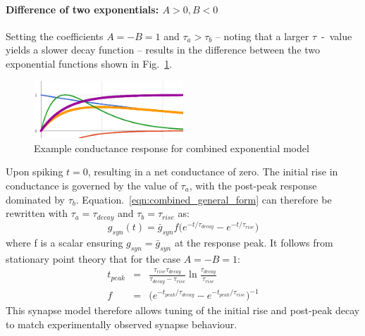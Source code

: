 \documentclass[12pt]{article}
\begin{document}
\paragraph{Difference of two exponentials: $A>0, B<0$ \newline}
\noindent Setting the coefficients $A = -B = 1$ and $\tau_a > \tau_b$ --
noting that a larger $\tau$~-~value yields a slower decay function -- results in
the difference between the two exponential functions shown in Fig.~\ref{fig:difference_exp_example}.
\begin{figure}[!h]
\begin{centering}
\includegraphics[width=0.5\textwidth]{figures/combined_general_difference.ps}
\caption{Example conductance response for combined exponential model}
\label{fig:difference_exp_example}
\end{centering}
\end{figure}
Upon spiking $t = 0$, resulting in a net conductance of zero. The initial rise
in conductance is governed by the value of $\tau_a$, with the post-peak response
dominated by $\tau_b$. Equation.~\ref{eqn:combined_general_form} can
therefore be rewritten with $\tau_a = \tau_{decay}$ and $\tau_b = \tau_{rise}$
as:
\begin{equation}
g_{syn}(t)=\bar{g}_{syn}f\Big(e^{-t / \tau_{decay}} - e^{-t /
\tau_{rise}}\Big)
\label{eqn:}
\end{equation}
where f is a scalar ensuring $g_{syn} = \bar{g}_{syn}$ at the response peak. It
follows from stationary point theory that for the case $A = -B = 1$:
\begin{eqnarray}
t_{peak}&=&\frac{\tau_{rise}\tau_{decay}}{\tau_{decay}
- \tau_{rise}}\ln\frac{\tau_{decay}}{\tau_{rise}} \nonumber
\\
f&=&\Big( e^{-t_{peak} / \tau_{decay}} - e^{-t_{peak} / \tau_{rise}}\Big)^{-1}
\nonumber
\label{eqn:combined_exponential_diff_response}
\end{eqnarray}
This synapse model therefore allows tuning of the initial rise and post-peak
decay to match experimentally observed synapse behaviour.
\end{document}

